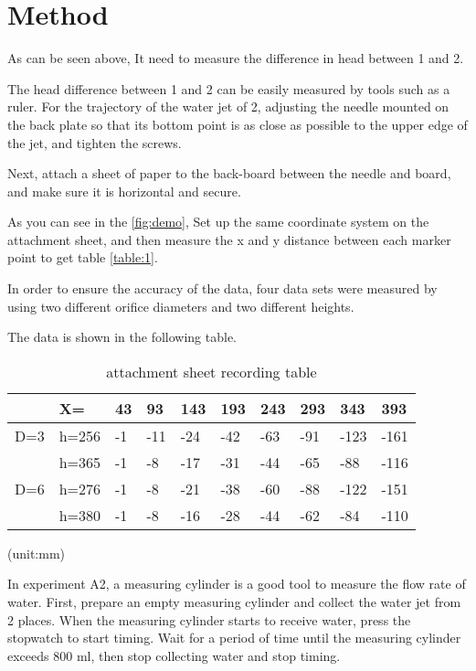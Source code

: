 \section{Method}

As can be seen above,  
It need to measure the difference in head between 1 and 2.

The head difference between 1 and 2 can be easily measured by tools such as a ruler.
For the trajectory of the water jet of 2, 
adjusting the needle mounted on the back plate so that its bottom point is as close as possible 
to the upper edge of the jet, and tighten the screws.

Next, attach a sheet 
of paper to the back-board between the needle and board,
and make sure it is horizontal and secure.

As you can see in the \autoref{fig:demo},
Set up the same coordinate system on the attachment sheet, 
and then measure the x and y distance between each marker point to get table 
\autoref{table:1}.

In order to ensure the accuracy of the data, 
four data sets were measured by using two different orifice diameters and 
two different heights.

The data is shown in the following table.

\begin{table}[htb]
    \centering
    \begin{tabular}{l|l|llllllll}
    \hline
      & X=    & 43 & 93  & 143 & 193 & 243 & 293 & 343  & 393   \\ 
    \hline
    D=3 & h=256 & -1 & -11 & -24 & -42 & -63 & -91 & -123 & -161  \\ 
    \cline{2-10}
        & h=365 & -1 & -8  & -17 & -31 & -44 & -65 & -88  & -116  \\ 
    \hline
    D=6 & h=276 & -1 & -8  & -21 & -38 & -60 & -88 & -122 & -151  \\ 
    \cline{2-10}
        & h=380 & -1 & -8  & -16 & -28 & -44 & -62 & -84  & -110  \\
    \hline
    \end{tabular}
    \label{table:1} 
    
    (unit:mm)
    \caption{attachment sheet recording table}

\end{table}




In experiment A2, a measuring cylinder is a good tool to measure the flow rate of water. 
First, prepare an empty measuring cylinder and collect the water jet from 2 places. 
When the measuring cylinder starts to receive water, press the stopwatch to start timing. 
Wait for a period of time until the measuring cylinder exceeds 800 ml, 
then stop collecting water and stop timing.


